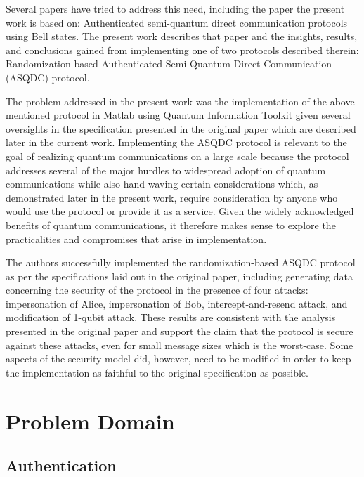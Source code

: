 \documentclass[conference]{IEEEtran}
\begin{document}
Several papers have tried to address this need, including
the paper the present work is based on: Authenticated semi-quantum
direct communication protocols using Bell states. The present work
describes that paper and the insights, results, and conclusions gained
from implementing one of two protocols described therein: Randomization-based
Authenticated Semi-Quantum Direct Communication (ASQDC) protocol.

The problem addressed in the present work was the implementation of
the above-mentioned protocol in Matlab using Quantum Information Toolkit
given several oversights in the specification presented in the original
paper which are described later in the current work. Implementing
the ASQDC protocol is relevant to the goal of realizing quantum communications
on a large scale because the protocol addresses several of the major
hurdles to widespread adoption of quantum communications while also
hand-waving certain considerations which, as demonstrated later in
the present work, require consideration by anyone who would use the
protocol or provide it as a service. Given the widely acknowledged
benefits of quantum communications, it therefore makes sense to explore
the practicalities and compromises that arise in implementation.

The authors successfully implemented the randomization-based ASQDC
protocol as per the specifications laid out in the original paper,
including generating data concerning the security of the protocol
in the presence of four attacks: impersonation of Alice, impersonation
of Bob, intercept-and-resend attack, and modification of 1-qubit attack.
These results are consistent with the analysis presented in the original
paper and support the claim that the protocol is secure against these
attacks, even for small message sizes which is the worst-case. Some
aspects of the security model did, however, need to be modified in
order to keep the implementation as faithful to the original specification
as possible.

\section{Problem Domain}

\subsection{Authentication}
\end{document}
